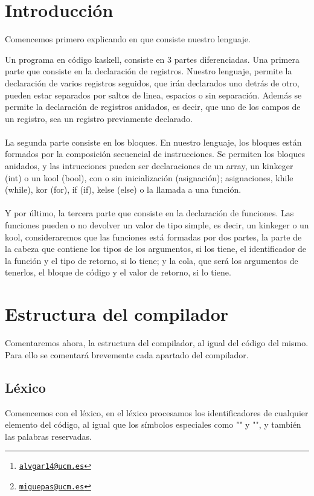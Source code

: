 \documentclass[a4paper, 11pt, twoside, openany, onecolumn, final]{memoir}
\title{\tb{Compilador Kaskell}}
\author{Álvaro García Tenorio \thanks{\texttt{\url{alvgar14@ucm.es}}}\and Miguel Pascual Domínguez\thanks{\texttt{\url{miguepas@ucm.es}}}}
\date{\today}
\begin{document}
	\maketitle
	\tableofcontents
	\chapter{Introducción}
	Comencemos primero explicando en que consiste nuestro lenguaje.
	
	Un programa en código kaskell, consiste en 3 partes diferenciadas.
	Una primera parte que consiste en la declaración de registros. Nuestro lenguaje, permite la declaración de varios registros seguidos, que irán declarados uno detrás de otro, pueden estar separados por saltos de linea, espacios o sin separación. Además se permite la declaración de registros anidados, es decir, que uno de los campos de un registro, sea un registro previamente declarado. 
\\\\
	La segunda parte consiste en los bloques. En nuestro lenguaje, los bloques están formados por la composición secuencial de instrucciones.
	Se permiten los bloques anidados, y las intrucciones pueden ser declaraciones de un array, un kinkeger (int) o un kool (bool), con o sin inicialización (asignación); asignaciones, khile (while), kor (for), if (if), kelse (else) o la llamada a una función.
\\\\	 
	Y por último, la tercera parte que consiste en la declaración de funciones. Las funciones pueden o no devolver un valor de tipo simple, es decir, un kinkeger o un kool, consideraremos que las funciones está formadas por dos partes, la parte de la cabeza que contiene los tipos de los argumentos, si los tiene, el identificador de la función y el tipo de retorno, si lo tiene; y la cola, que será los argumentos de tenerlos, el bloque de código y el valor de retorno, si lo tiene. 

	\chapter{Estructura del compilador}
	Comentaremos ahora, la estructura del compilador, al igual del código del mismo. Para ello se comentará brevemente cada apartado del compilador.	
	
	\section{Léxico}
	Comencemos con el léxico, en el léxico procesamos los identificadores de cualquier elemento del código, al igual que los símbolos especiales como "{" y "}", y también las palabras reservadas.
	
\end{document}
